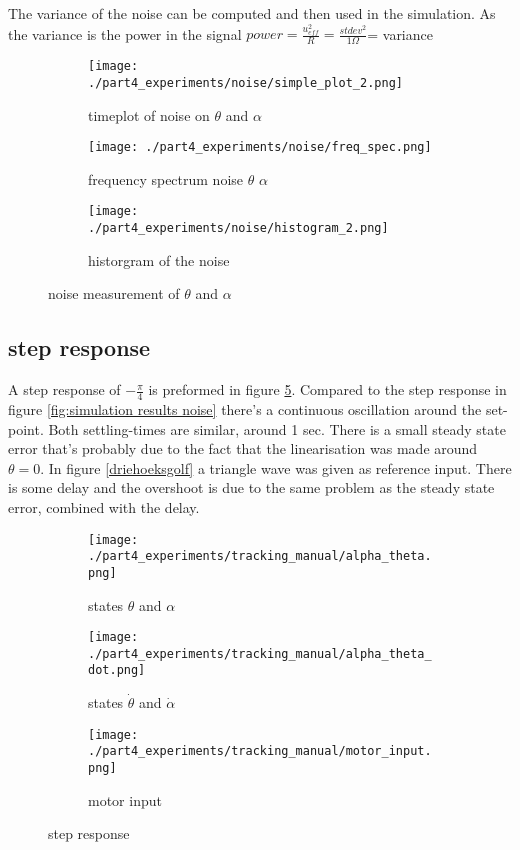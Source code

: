 	The variance of the noise can be computed and then used in the simulation. As the variance is the power in the signal $power = \frac{u_{eff}^2}{R} = \frac{stdev^2}{1 \Omega}$= variance
		
	\begin{figure}[H]
		\centering
		\begin{subfigure}[b]{0.30\textwidth}
			\texttt{[image: ./part4\_experiments/noise/simple\_plot\_2.png]}
			\caption{timeplot of noise on $\theta$ and $\alpha$}
			\label{fig:time noise}
		\end{subfigure}
		\begin{subfigure}[b]{0.30\textwidth}
			\texttt{[image: ./part4\_experiments/noise/freq\_spec.png]}
			\caption{frequency spectrum noise $\theta$ $\alpha$}
			\label{fig:freq noise}
		\end{subfigure}
		\begin{subfigure}[b]{0.30\textwidth}
			\texttt{[image: ./part4\_experiments/noise/histogram\_2.png]}
			\caption{historgram of the noise}
			\label{fig:hist noise}
		\end{subfigure}
		\caption{noise measurement of $\theta$ and $\alpha$}
	\end{figure}


\subsection{step response}
	A step response of $-\frac{\pi}{4}$ is preformed in figure \ref{fig:step_1}. Compared to the step response in figure \ref{fig:simulation results noise} there's a continuous oscillation around the set-point. Both settling-times are similar, around 1 sec. There is a small steady state error that's probably due to the fact that the linearisation was made around $\theta = 0$. In figure \ref{driehoeksgolf} a triangle wave was given as reference input. There is some delay and the overshoot is due to the same problem as the steady state error, combined with the delay. 

	\begin{figure}[H]
		\centering
		\begin{subfigure}[b]{0.4\textwidth}
			\texttt{[image: ./part4\_experiments/tracking\_manual/alpha\_theta.png]}
			\caption{states $\theta$ and $\alpha$}
		\end{subfigure}
		\begin{subfigure}[b]{0.4\textwidth}
			\texttt{[image: ./part4\_experiments/tracking\_manual/alpha\_theta\_dot.png]}
			\caption{states $\dot{\theta}$ and $\dot{\alpha}$}
		\end{subfigure}
		\begin{subfigure}[b]{0.4\textwidth}
			\texttt{[image: ./part4\_experiments/tracking\_manual/motor\_input.png]}
			\caption{motor input}
		\end{subfigure}
		\caption{step response}
		\label{fig:step_1}
	\end{figure}
	
